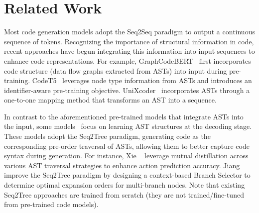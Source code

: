 \section{Related Work}
Most code generation models adopt the Seq2Seq paradigm to output a continuous sequence of tokens. Recognizing the importance of structural information in code, recent approaches have begun integrating this information into input sequences to enhance code representations. For example, GraphCodeBERT~\cite{DBLP:conf/iclr/GuoRLFT0ZDSFTDC21} first incorporates code structure (\ie data flow graphs extracted from ASTs) into input during pre-training. %
CodeT5~\cite{DBLP:conf/emnlp/0034WJH21} leverages node type information from ASTs and introduces an identifier-aware pre-training objective. UniXcoder~\cite{DBLP:conf/acl/GuoLDW0022} incorporates ASTs through a one-to-one mapping method that transforms an AST into a sequence.

In contrast to the aforementioned pre-trained models that integrate ASTs into the input, some models~\cite{DBLP:conf/aaai/XieSGLCYW21, DBLP:conf/acl/JiangZM00H0S20} focus on learning AST structures at the decoding stage. These models adopt the Seq2Tree paradigm, generating code as the corresponding pre-order traversal of ASTs, allowing them to better capture code syntax during generation. For instance, Xie \etal ~\cite{DBLP:conf/aaai/XieSGLCYW21} leverage mutual distillation across various AST traversal strategies to enhance action prediction accuracy. Jiang \etal~\cite{DBLP:conf/acl/JiangZM00H0S20} improve the Seq2Tree paradigm by designing a context-based Branch Selector to determine optimal expansion orders for multi-branch nodes. Note that existing Seq2Tree approaches are trained from scratch (\ie they are not trained/fine-tuned from pre-trained code models).



